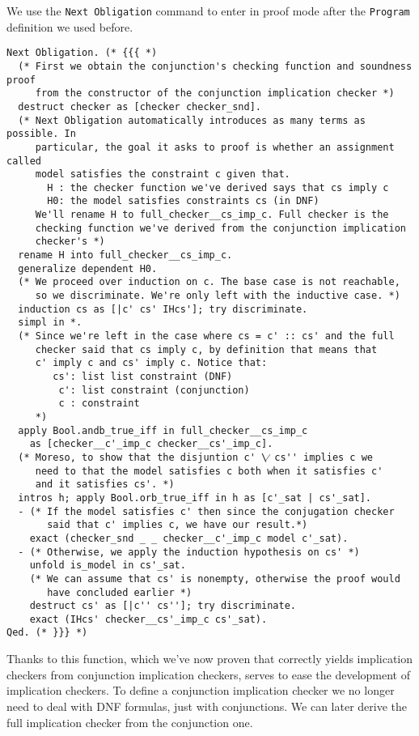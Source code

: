 We use the \texttt{Next Obligation} command to enter in proof mode after the \texttt{Program} definition we used before.

\begin{verbatim}
Next Obligation. (* {{{ *)
  (* First we obtain the conjunction's checking function and soundness proof
     from the constructor of the conjunction implication checker *)
  destruct checker as [checker checker_snd].
  (* Next Obligation automatically introduces as many terms as possible. In
     particular, the goal it asks to proof is whether an assignment called 
     model satisfies the constraint c given that.
       H : the checker function we've derived says that cs imply c
       H0: the model satisfies constraints cs (in DNF)
     We'll rename H to full_checker__cs_imp_c. Full checker is the
     checking function we've derived from the conjunction implication
     checker's *)
  rename H into full_checker__cs_imp_c.
  generalize dependent H0.
  (* We proceed over induction on c. The base case is not reachable,
     so we discriminate. We're only left with the inductive case. *)
  induction cs as [|c' cs' IHcs']; try discriminate.
  simpl in *.
  (* Since we're left in the case where cs = c' :: cs' and the full
     checker said that cs imply c, by definition that means that
     c' imply c and cs' imply c. Notice that:
        cs': list list constraint (DNF)
         c': list constraint (conjunction)
         c : constraint
     *)
  apply Bool.andb_true_iff in full_checker__cs_imp_c 
    as [checker__c'_imp_c checker__cs'_imp_c].
  (* Moreso, to show that the disjuntion c' \⁄ cs'' implies c we
     need to that the model satisfies c both when it satisfies c' 
     and it satisfies cs'. *)
  intros h; apply Bool.orb_true_iff in h as [c'_sat | cs'_sat].
  - (* If the model satisfies c' then since the conjugation checker
       said that c' implies c, we have our result.*)
    exact (checker_snd _ _ checker__c'_imp_c model c'_sat).
  - (* Otherwise, we apply the induction hypothesis on cs' *)
    unfold is_model in cs'_sat.
    (* We can assume that cs' is nonempty, otherwise the proof would
       have concluded earlier *)
    destruct cs' as [|c'' cs'']; try discriminate.
    exact (IHcs' checker__cs'_imp_c cs'_sat).
Qed. (* }}} *)
\end{verbatim}

Thanks to this function, which we've now proven that correctly yields
implication checkers from conjunction implication checkers, serves to ease the 
development of implication checkers. To define a conjunction implication checker
we no longer need to deal with DNF formulas, just with conjunctions. We can later
derive the full implication checker from the conjunction one.

